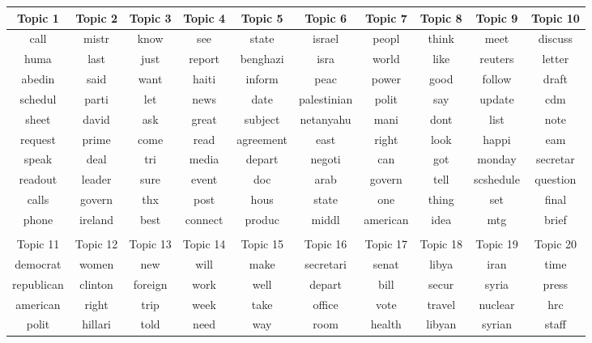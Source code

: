\setlength{\tabcolsep}{4pt}
\begin{tabular}{cccccccccc}
  \toprule
  Topic 1 & Topic 2 & Topic 3 & Topic 4 & Topic 5   & Topic 6     & Topic 7  & Topic 8 & Topic 9   & Topic 10 \\
  \midrule
  call    & mistr   & know    & see     & state     & israel      & peopl    & think   & meet      & discuss  \\
  huma    & last    & just    & report  & benghazi  & isra        & world    & like    & reuters   & letter   \\
  abedin  & said    & want    & haiti   & inform    & peac        & power    & good    & follow    & draft    \\
  schedul & parti   & let     & news    & date      & palestinian & polit    & say     & update    & cdm      \\
  sheet   & david   & ask     & great   & subject   & netanyahu   & mani     & dont    & list      & note     \\
  request & prime   & come    & read    & agreement & east        & right    & look    & happi     & eam      \\
  speak   & deal    & tri     & media   & depart    & negoti      & can      & got     & monday    & secretar \\
  readout & leader  & sure    & event   & doc       & arab        & govern   & tell    & scshedule & question \\
  calls   & govern  & thx     & post    & hous      & state       & one      & thing   & set       & final    \\
  phone   & ireland & best    & connect & produc    & middl       & american & idea    & mtg       & brief    \\
  \bottomrule \\
  \toprule
  Topic 11   & Topic 12  & Topic 13 & Topic 14 & Topic 15 & Topic 16   & Topic 17   & Topic 18 & Topic 19 & Topic 20 \\
  \midrule
  democrat   & women     & new      & will     & make     & secretari  & senat      & libya    & iran     & time \\
  republican & clinton   & foreign  & work     & well     & depart     & bill       & secur    & syria    & press \\
  american   & right     & trip     & week     & take     & office     & vote       & travel   & nuclear  & hrc \\
  polit      & hillari   & told     & need     & way      & room       & health     & libyan   & syrian   & staff \\

\end{tabular}
